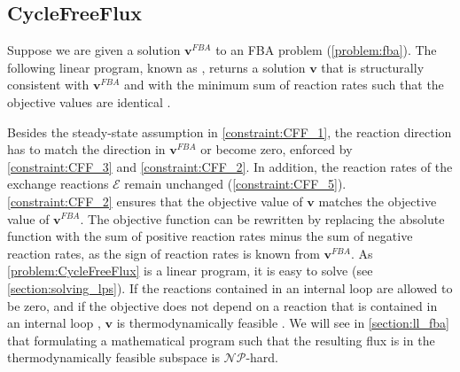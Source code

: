 
\subsection{CycleFreeFlux} \label{section:molecular_networks_cyclefreeflux}
Suppose we are given a solution $\mathbf v^{FBA}$ to an \textsf{FBA} problem (\cref{problem:fba}). 
The following linear program, known as , returns a solution $\mathbf v$ that is structurally consistent with $\mathbf v^{FBA}$ and with the minimum sum of reaction rates such that the objective values are identical \cite{desouki_cyclefreeflux_2015-1}. 

\vspace*{-\baselineskip}

Besides the steady-state assumption in \cref{constraint:CFF_1}, the reaction direction has to match the direction in $\mathbf v^{FBA}$ or become zero, enforced by \cref{constraint:CFF_3} and \cref{constraint:CFF_2}. In addition, the reaction rates of the exchange reactions $\mathcal{E}$ remain unchanged (\cref{constraint:CFF_5}).
\cref{constraint:CFF_2} ensures that the objective value of $\mathbf v$ matches the objective value of $\mathbf v^{FBA}$. The objective function can be rewritten by replacing the absolute function with the sum of positive reaction rates minus the sum of negative reaction rates, as the sign of reaction rates is known from $\mathbf v^{FBA}$. As \cref{problem:CycleFreeFlux} is a linear program, it is easy to solve (see \cref{section:solving_lps}). 
If the reactions contained in an internal loop are allowed to be zero, and if the objective does not depend on a reaction that is contained in an internal loop%
, $\mathbf v$ is thermodynamically feasible \cite{noor_removing_2018}. 
We will see in \cref{section:ll_fba} that formulating a mathematical program such that the resulting flux is in the thermodynamically feasible subspace is $\mathcal{NP}$-hard.

